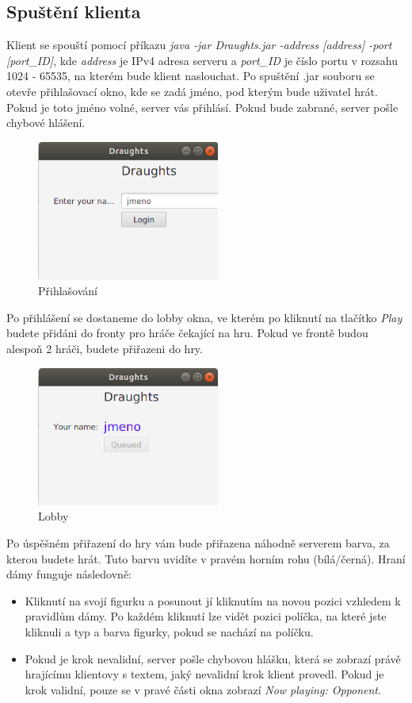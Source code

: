 \documentclass[12pt, a4paper]{article}
\begin{document}
\subsection{Spuštění klienta}
\label{Spuštění_klienta}
Klient se spouští pomocí příkazu \textit{java -jar Draughts.jar -address [address] -port [port\_ID]}, kde \textit{address} je IPv4 adresa serveru a \textit{port\_ID} je číslo portu v rozsahu 1024 - 65535, na kterém bude klient naslouchat.
\newline
Po spuštění .jar souboru se otevře přihlašovací okno, kde se zadá jméno, pod kterým bude uživatel hrát. Pokud je toto jméno volné, server vás přihlásí. Pokud bude zabrané, server pošle chybové hlášení.
\begin {figure}[h]
\centering
\includegraphics[width=6cm]{img/login}
\caption{Přihlašování}
\label{fig:login}
\end {figure}
\newpage
Po přihlášení se dostaneme do lobby okna, ve kterém po kliknutí na tlačítko \textit{Play} budete přidáni do fronty pro hráče čekající na hru. Pokud ve frontě budou alespoň 2 hráči, budete přiřazeni do hry.
\begin {figure}[h]
\centering
\includegraphics[width=6cm]{img/lobby}
\caption{Lobby}
\label{fig:lobby}
\end {figure}
\newline
Po úspěšném přiřazení do hry vám bude přiřazena náhodně serverem barva, za kterou budete hrát. Tuto barvu uvidíte v pravém horním rohu (bílá/černá). Hraní dámy funguje následovně: 
\begin{itemize}
\item Kliknutí na svojí figurku a posunout jí kliknutím na novou pozici vzhledem k pravidlům dámy. Po každém kliknutí lze vidět pozici políčka, na které jste kliknuli a typ a barva figurky, pokud se nachází na políčku.
\item Pokud je krok nevalidní, server pošle chybovou hlášku, která se zobrazí právě hrajícímu klientovy s textem, jaký nevalidní krok klient provedl. Pokud je krok validní, pouze se v pravé části okna zobrazí \textit{Now playing: Opponent}.
\end{itemize}
\end{document}
